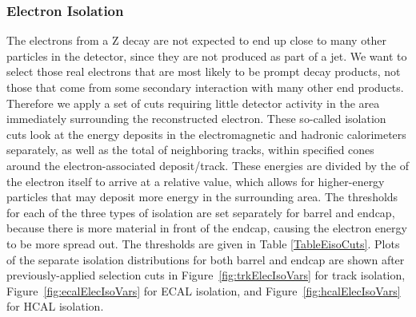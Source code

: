 \subsubsection{Electron Isolation}
\label{evSel:isol}
The electrons from a Z decay are not expected to end up 
close to many other particles in the detector, 
since they are not produced as part of a jet.  
We want to select those real electrons that are most likely to be prompt decay products,
not those that come from some secondary interaction with many other end products.  
Therefore we apply a set of cuts requiring little detector activity 
in the area immediately surrounding the reconstructed electron.  
These so-called isolation cuts look at the energy deposits 
in the electromagnetic and hadronic calorimeters separately,
as well as the total \pt of neighboring tracks, 
within specified \DR cones around the electron-associated deposit/track.  
These energies are divided by the \pt of the electron itself to arrive at a relative value,
which allows for higher-energy particles that may deposit more energy in the surrounding area.  
The thresholds for each of the three types of isolation are set separately for barrel and endcap, 
because there is more material in front of the endcap, 
causing the electron energy to be more spread out.  
The thresholds are given in Table \ref{TableEisoCuts}.  
Plots of the separate isolation distributions for both barrel and endcap 
are shown after previously-applied selection cuts in 
Figure~\ref{fig:trkElecIsoVars} for track isolation, 
Figure~\ref{fig:ecalElecIsoVars} for ECAL isolation, and 
Figure~\ref{fig:hcalElecIsoVars} for HCAL isolation.  




